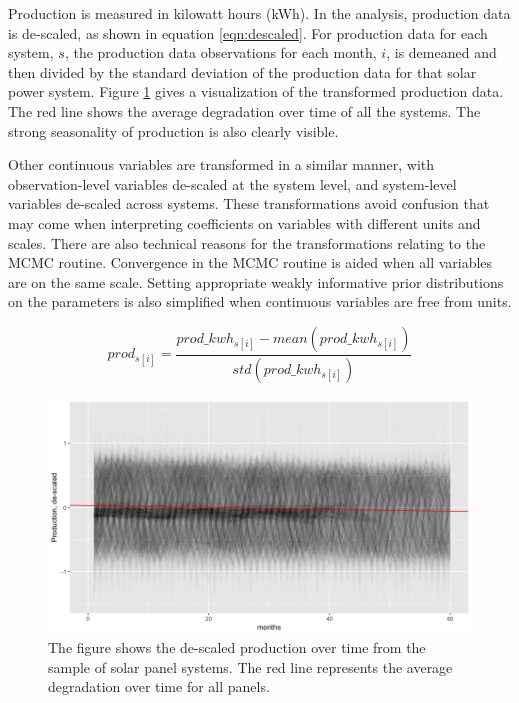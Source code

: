 \documentclass[a4paper]{article}
\begin{document}
Production is measured in kilowatt hours (kWh). In the analysis, production data is de-scaled, as shown in equation \ref{eqn:descaled}.  For production data for each system, $s$, the production data observations for each month, $i$, is demeaned and then divided by the standard deviation of the production data for that solar power system. Figure \ref{fig:production} gives a visualization of the transformed production data. The red line shows the average degradation over time of all the systems. The strong seasonality of production is also clearly visible.

Other continuous variables are transformed in a similar manner, with observation-level variables de-scaled at the system level, and system-level variables de-scaled across systems. These transformations avoid confusion that may come when interpreting coefficients on variables with different units and scales. There are also technical reasons for the transformations relating to the MCMC routine. Convergence in the MCMC routine is aided when all variables are on the same scale. Setting appropriate weakly informative prior distributions on the parameters is also simplified when continuous variables are free from units.

\begin{equation}
prod_{s[i]} = \frac{prod\_kwh_{s[i]} - mean(prod\_kwh_{s[i]})}{std(prod\_kwh_{s[i]})}
\label{eqn:descaled}
\end{equation}

\begin{figure}
  \includegraphics[width=1\linewidth]{figures/production.png}
  \caption{The figure shows the de-scaled production over time from the sample of solar panel systems. The red line represents the average degradation over time for all panels.}
  \label{fig:production}
\end{figure}
\end{document}
